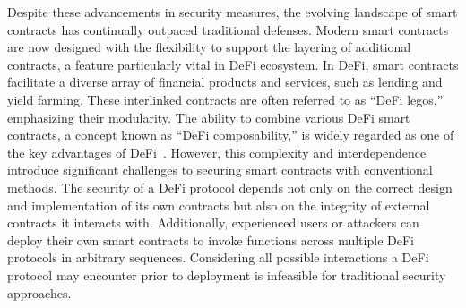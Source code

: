 Despite these advancements in security measures, the evolving landscape of smart 
contracts has continually outpaced traditional defenses.
Modern smart
contracts are now designed with the flexibility to support the layering of
additional contracts, a feature particularly vital in DeFi ecosystem. In DeFi, smart contracts facilitate a diverse array of
financial products and services, such as lending and
yield farming. These interlinked contracts are often referred to as ``DeFi
legos,'' emphasizing their modularity. The ability to combine various DeFi smart
contracts, a concept known as ``DeFi composability,'' is widely regarded as one
of the key advantages of DeFi~\cite{popescu2020decentralized, amler2021defi,
schar2021decentralized}. 
However, this complexity and interdependence introduce
significant challenges to securing smart contracts with conventional methods.
The security of a DeFi protocol depends not only on the correct design and 
implementation of its own contracts but also on the integrity of external 
contracts it interacts with. Additionally, experienced users or attackers can 
deploy their own smart contracts to invoke functions across 
multiple DeFi protocols in arbitrary sequences. 
Considering all possible interactions a DeFi 
protocol may encounter prior to deployment is infeasible for traditional 
security approaches.



